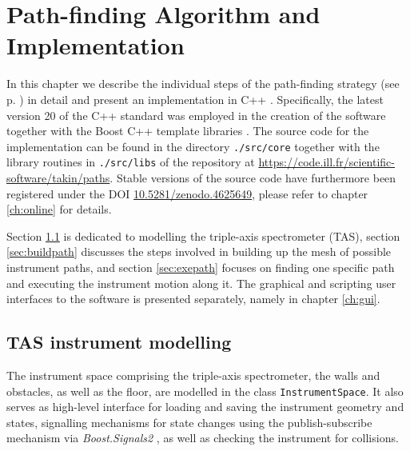 %
%

\chapter{Path-finding Algorithm and Implementation}
\label{ch:impl}

In this chapter we describe the individual steps of the path-finding strategy (see p. \pageref{sec:strategy}) 
in detail and present an implementation in C++ \cite{Stroustrup2008, Stroustrup2018}. 
Specifically, the latest version 20 of the C++ standard \cite{ISOCPP20} was employed in the creation of the software
together with the Boost C++ template libraries \cite{web_boost}. The source code for the implementation
can be found in the directory \lstinline|./src/core| together with the library routines in \lstinline|./src/libs|
of the repository at \url{https://code.ill.fr/scientific-software/takin/paths}. Stable versions of the
source code have furthermore been registered under the DOI \href{https://doi.org/10.5281/zenodo.4625649}{10.5281/zenodo.4625649},
please refer to chapter \ref{ch:online} for details.

Section \ref{sec:tasmodel} is dedicated to modelling the triple-axis spectrometer (TAS), 
section \ref{sec:buildpath} discusses the steps involved in building up the mesh of possible instrument paths, 
and section \ref{sec:exepath} focuses on finding one specific path and executing the instrument motion along it.
The graphical and scripting user interfaces to the software is presented separately, namely in chapter \ref{ch:gui}.




\section{TAS instrument modelling}
\label{sec:tasmodel}

The instrument space comprising the triple-axis spectrometer, the walls and obstacles, as well as the floor, are modelled in
the class \lstinline[language=C++]|InstrumentSpace|. It also serves as high-level interface for loading and saving
the instrument geometry and states, signalling mechanisms for state changes using the publish-subscribe mechanism
via \textit{Boost.Signals2} \cite{web_boost_signals}, as well as checking the instrument for collisions.

